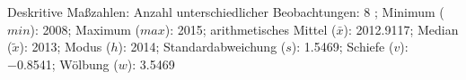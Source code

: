                     \begin{noten}
                	    \note{} Deskritive Maßzahlen:
                	    Anzahl unterschiedlicher Beobachtungen: 8%
                	    ; 
                	      Minimum ($min$): 2008; 
                	      Maximum ($max$): 2015; 
                	      arithmetisches Mittel ($\bar{x}$): \num[round-mode=places,round-precision=2]{2012,9117}; 
                	      Median ($\tilde{x}$): 2013; 
                	      Modus ($h$): 2014; 
                	      Standardabweichung ($s$): \num[round-mode=places,round-precision=2]{1,5469}; 
                	      Schiefe ($v$): \num[round-mode=places,round-precision=2]{-0,8541}; 
                	      Wölbung ($w$): \num[round-mode=places,round-precision=2]{3,5469}
                     \end{noten}


